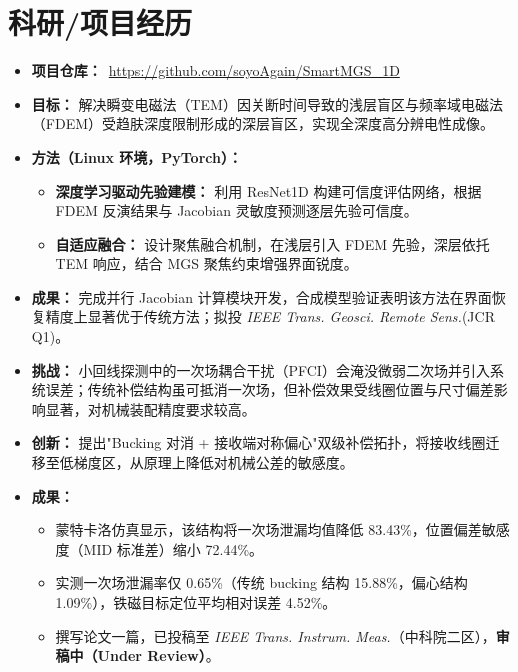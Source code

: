 \documentclass{resume}
\begin{document}
\section{科研/项目经历}
\begin{itemize}[parsep=0.2ex]
  \item \textbf{项目仓库：}\faGithub\ \url{https://github.com/soyoAgain/SmartMGS_1D}
  \item \textbf{目标：} 解决瞬变电磁法（TEM）因关断时间导致的浅层盲区与频率域电磁法（FDEM）受趋肤深度限制形成的深层盲区，实现全深度高分辨电性成像。
  \item \textbf{方法（Linux 环境，PyTorch）：}
  \begin{itemize}
    \item \textbf{深度学习驱动先验建模：} 利用 ResNet1D 构建可信度评估网络，根据 FDEM 反演结果与 Jacobian 灵敏度预测逐层先验可信度。
    \item \textbf{自适应融合：} 设计聚焦融合机制，在浅层引入 FDEM 先验，深层依托 TEM 响应，结合 MGS 聚焦约束增强界面锐度。
  \end{itemize}
  \item \textbf{成果：} 完成并行 Jacobian 计算模块开发，合成模型验证表明该方法在界面恢复精度上显著优于传统方法；拟投 \textit{IEEE Trans. Geosci. Remote Sens.}(JCR Q1)。
\end{itemize}
\begin{itemize}[parsep=0.2ex]
  \item \textbf{挑战：} 小回线探测中的一次场耦合干扰（PFCI）会淹没微弱二次场并引入系统误差；传统补偿结构虽可抵消一次场，但补偿效果受线圈位置与尺寸偏差影响显著，对机械装配精度要求较高。
  \item \textbf{创新：} 提出"Bucking 对消 + 接收端对称偏心"双级补偿拓扑，将接收线圈迁移至低梯度区，从原理上降低对机械公差的敏感度。
  \item \textbf{成果：}
  \begin{itemize}
    \item 蒙特卡洛仿真显示，该结构将一次场泄漏均值降低 83.43\%，位置偏差敏感度（MID 标准差）缩小 72.44\%。
    \item 实测一次场泄漏率仅 0.65\%（传统 bucking 结构 15.88\%，偏心结构 1.09\%），铁磁目标定位平均相对误差 4.52\%。
    \item 撰写论文一篇，已投稿至 \textcolor{publication}{\textit{IEEE Trans. Instrum. Meas.}（中科院二区），\textbf{审稿中（Under Review）}}。
  \end{itemize}
\end{itemize}
\end{document}
